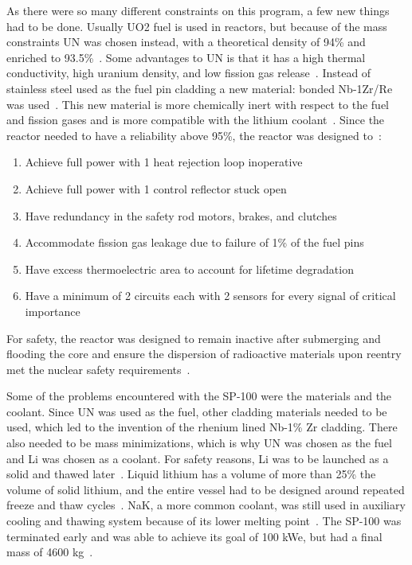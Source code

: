 \documentclass{article}
\begin{document}
As there were so many different constraints on this program, a few new things had to be done. Usually UO2 fuel is used in reactors, but because of the mass constraints UN was chosen instead, with a theoretical density of 94\% and enriched to 93.5\%~\cite{demuth2003sp100}. Some advantages to UN is that it has a high thermal conductivity, high uranium density, and low fission gas release~\cite{el1992decay}. Instead of stainless steel used as the fuel pin cladding a new material: bonded Nb-1Zr/Re was used~\cite{el1992decay}. This new material is more chemically inert with respect to the fuel and fission gases and is more compatible with the lithium coolant~\cite{demuth2003sp100}. Since the reactor needed to have a reliability above 95\%, the reactor was designed to~\cite{demuth2003sp100}:
\begin{enumerate}
\item Achieve full power with 1 heat rejection loop inoperative
\item Achieve full power with 1 control reflector stuck open
\item Have redundancy in the safety rod motors, brakes, and clutches
\item Accommodate fission gas leakage due to failure of 1\% of the fuel pins
\item Have excess thermoelectric area to account for lifetime degradation
\item Have a minimum of 2 circuits each with 2 sensors for every signal of critical importance
\end{enumerate}

For safety, the reactor was designed to remain inactive after submerging and flooding the core and ensure the dispersion of radioactive materials upon reentry met the nuclear safety requirements~\cite{anderson1983power}.


Some of the problems encountered with the SP-100 were the materials and the coolant. Since UN was used as the fuel, other cladding materials needed to be used, which led to the invention of the rhenium lined Nb-1\% Zr cladding. There also needed to be mass minimizations, which is why UN was chosen as the fuel and Li was chosen as a coolant. For safety reasons, Li was to be launched as a solid and thawed later~\cite{anderson1983power}. Liquid lithium has a volume of more than 25\% the volume of solid lithium, and the entire vessel had to be designed around repeated freeze and thaw cycles~\cite{anderson1983power}. NaK, a more common coolant, was still used in auxiliary cooling and thawing system because of its lower melting point~\cite{anderson1983power}. The SP-100 was terminated early and was able to achieve its goal of 100 kWe, but had a final mass of 4600 kg~\cite{anderson1983power}.
\end{document}

